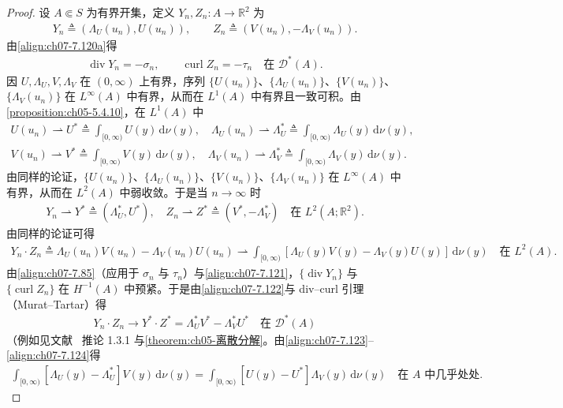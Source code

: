\documentclass[../../main.tex]{subfiles}%
\begin{document}
\begin{proof}
设 $A\Subset S$ 为有界开集，定义 $Y_n,Z_n:A\to\mathbb{R}^2$ 为
\begin{align*}
Y_n\triangleq (\Lambda_U(u_n),U(u_n)),\qquad Z_n\triangleq (V(u_n),-\Lambda_V(u_n)).
\end{align*}
由\eqref{align:ch07-7.120a}得
\begin{align}
\operatorname{div}Y_n=-\sigma_n,\qquad \operatorname{curl}Z_n=-\tau_n\quad\text{在 }\mathcal{D}^*(A). \label{align:ch07-7.121}
\end{align}
因 $U,\Lambda_U,V,\Lambda_V$ 在 $(0,\infty)$ 上有界，序列 $\{U(u_n)\}$、$\{\Lambda_U(u_n)\}$、$\{V(u_n)\}$、$\{\Lambda_V(u_n)\}$ 在 $L^\infty(A)$ 中有界，从而在 $L^1(A)$ 中有界且一致可积。由\cref{proposition:ch05-5.4.10}，在 $L^1(A)$ 中
\begin{align*}
U(u_n)\rightharpoonup U^*\triangleq \int_{[0,\infty)}U(y)\,\mathrm{d}\nu(y),\quad
\Lambda_U(u_n)\rightharpoonup\Lambda_U^*\triangleq \int_{[0,\infty)}\Lambda_U(y)\,\mathrm{d}\nu(y),
\end{align*}
\begin{align*}
V(u_n)\rightharpoonup V^*\triangleq \int_{[0,\infty)}V(y)\,\mathrm{d}\nu(y),\quad
\Lambda_V(u_n)\rightharpoonup\Lambda_V^*\triangleq \int_{[0,\infty)}\Lambda_V(y)\,\mathrm{d}\nu(y).
\end{align*}
由同样的论证，$\{U(u_n)\}$、$\{\Lambda_U(u_n)\}$、$\{V(u_n)\}$、$\{\Lambda_V(u_n)\}$ 在 $L^\infty(A)$ 中有界，从而在 $L^2(A)$ 中弱收敛。于是当 $n\to\infty$ 时
\begin{align}
Y_n\rightharpoonup Y^*\triangleq (\Lambda_U^*,U^*),\quad
Z_n\rightharpoonup Z^*\triangleq (V^*,-\Lambda_V^*)\quad\text{在 }L^2(A;\mathbb{R}^2). \label{align:ch07-7.122}
\end{align}
由同样的论证可得
\begin{align}
Y_n\cdot Z_n\triangleq \Lambda_U(u_n)V(u_n)-\Lambda_V(u_n)U(u_n)
\rightharpoonup\int_{[0,\infty)}[\Lambda_U(y)V(y)-\Lambda_V(y)U(y)]\,\mathrm{d}\nu(y)
\quad\text{在 }L^2(A). \label{align:ch07-7.123}
\end{align}
由\eqref{align:ch07-7.85}（应用于 $\sigma_n$ 与 $\tau_n$）与\eqref{align:ch07-7.121}，$\{\operatorname{div}Y_n\}$ 与 $\{\operatorname{curl}Z_n\}$ 在 $H^{-1}(A)$ 中预紧。于是由\eqref{align:ch07-7.122}与 div--curl 引理（Murat--Tartar）得
\begin{align}
Y_n\cdot Z_n\to Y^*\cdot Z^*=\Lambda_U^*V^*-\Lambda_V^*U^*\quad\text{在 }\mathcal{D}^*(A) \label{align:ch07-7.124}
\end{align}
（例如见文献~\cite{ref46} 推论 1.3.1 与\cref{theorem:ch05-离散分解}。由\eqref{align:ch07-7.123}--\eqref{align:ch07-7.124}得
\begin{align}
\int_{[0,\infty)}[\Lambda_U(y)-\Lambda_U^*]V(y)\,\mathrm{d}\nu(y)
=\int_{[0,\infty)}[U(y)-U^*]\Lambda_V(y)\,\mathrm{d}\nu(y)
\quad\text{在 }A\text{ 中几乎处处}. \label{align:ch07-7.125}
\end{align}


\end{proof}
\end{document}
